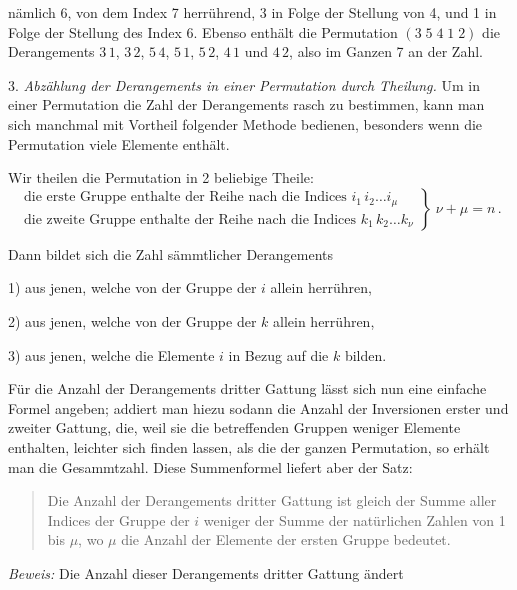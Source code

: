 \documentclass[11pt]{article}
\providecommand{\weberpage}[1]{}
\begin{document}
\weberpage{2}

nämlich 6, von dem Index 7 herrührend, 3 in Folge der Stellung von 4, und 1 in Folge der Stellung des Index 6. Ebenso enthält die Permutation $(3\;5\;4\;1\;2)$ die Derangements $3\,1$, $3\,2$, $5\,4$, $5\,1$, $5\,2$, $4\,1$ und $4\,2$, also im Ganzen 7 an der Zahl.

3. \textit{Abzählung der Derangements in einer Permutation durch Theilung.} Um in einer Permutation die Zahl der Derangements rasch zu bestimmen, kann man sich manchmal mit Vortheil folgender Methode bedienen, besonders wenn die Permutation viele Elemente enthält.

Wir theilen die Permutation in 2 beliebige Theile:
\[
\left.
\begin{array}{l}
\text{die erste Gruppe enthalte der Reihe nach die Indices } i_1\,i_2\dots i_\mu\\[2pt]
\text{die zweite Gruppe enthalte der Reihe nach die Indices } k_1\,k_2\dots k_\nu
\end{array}
\right\}\;\nu+\mu=n\,.
\]

Dann bildet sich die Zahl sämmtlicher Derangements

1) aus jenen, welche von der Gruppe der $i$ allein herrühren,

2) aus jenen, welche von der Gruppe der $k$ allein herrühren,

3) aus jenen, welche die Elemente $i$ in Bezug auf die $k$ bilden.

Für die Anzahl der Derangements dritter Gattung lässt sich nun eine einfache Formel angeben; addiert man hiezu sodann die Anzahl der Inversionen erster und zweiter Gattung, die, weil sie die betreffenden Gruppen weniger Elemente enthalten, leichter sich finden lassen, als die der ganzen Permutation, so erhält man die Gesammtzahl. Diese Summenformel liefert aber der Satz:

\begin{quote}
\glqq Die Anzahl der Derangements dritter Gattung ist gleich der Summe aller Indices der Gruppe der $i$ weniger der Summe der natürlichen Zahlen von 1 bis $\mu$, wo $\mu$ die Anzahl der Elemente der ersten Gruppe bedeutet.\grqq{}
\end{quote}

\textit{Beweis:} Die Anzahl dieser Derangements dritter Gattung ändert


\weberpage{3}
\end{document}
